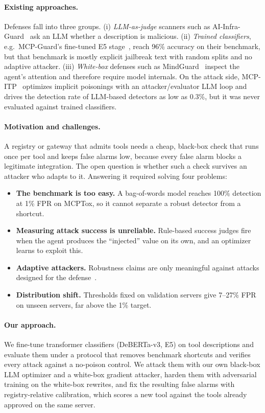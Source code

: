 \documentclass{article}
\begin{document}
\paragraph{Existing approaches.} Defenses fall into three groups. (i) \emph{LLM-as-judge} scanners such as
AI-Infra-Guard~\cite{aiinfraguard} ask an LLM whether a description is malicious. (ii) \emph{Trained classifiers}, e.g.\
MCP-Guard's fine-tuned E5 stage~\cite{xing2025mcpguard}, reach 96\% accuracy on their benchmark, but that benchmark is
mostly explicit jailbreak text with random splits and no adaptive attacker. (iii) \emph{White-box} defenses such as
MindGuard~\cite{wang2025mindguard} inspect the agent's attention and therefore require model internals. On the attack
side, MCP-ITP~\cite{li2026mcpitp} optimizes implicit poisonings with an attacker/evaluator LLM loop and drives the
detection rate of LLM-based detectors as low as 0.3\%, but it was never evaluated against trained classifiers.

\paragraph{Motivation and challenges.} A registry or gateway that admits tools needs a cheap, black-box check that
runs once per tool and keeps false alarms low, because every false alarm blocks a legitimate integration. The open
question is whether such a check survives an attacker who adapts to it. Answering it required solving four problems:
\begin{itemize}
\item \textbf{The benchmark is too easy.} A bag-of-words model reaches 100\% detection at 1\% FPR on MCPTox, so it cannot
      separate a robust detector from a shortcut.
\item \textbf{Measuring attack success is unreliable.} Rule-based success judges fire when the agent produces the
      ``injected'' value on its own, and an optimizer learns to exploit this.
\item \textbf{Adaptive attackers.} Robustness claims are only meaningful against attacks designed for the
      defense~\cite{tramer2020adaptive}.
\item \textbf{Distribution shift.} Thresholds fixed on validation servers give 7--27\% FPR on unseen servers, far above
      the 1\% target.
\end{itemize}

\paragraph{Our approach.} We fine-tune transformer classifiers (DeBERTa-v3, E5) on tool descriptions and evaluate them
under a protocol that removes benchmark shortcuts and verifies every attack against a no-poison control. We attack
them with our own black-box LLM optimizer and a white-box gradient attacker, harden them with adversarial training on
the white-box rewrites, and fix the resulting false alarms with registry-relative calibration, which scores a new tool
against the tools already approved on the same server.
\end{document}
